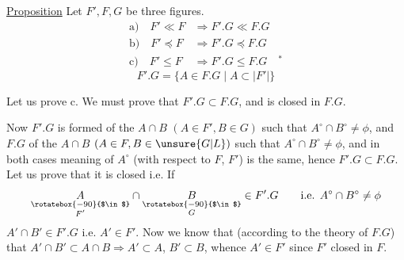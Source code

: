 \uline{Proposition} Let $F',F,G$ be three figures.
\[
\begin{aligned}
 \text{a)}\quad F'\ll F&\Longrightarrow F'.G\ll F.G\\
 \text{b)}\quad F'\preceq F&\Longrightarrow F'.G\preceq F.G\\
 \text{c)}\quad F'\leq F&\Longrightarrow F'.G\leq F.G\quad{}^{*}
\end{aligned}
\]
\[
 F'.G=\{A\in F.G\mid A\subset |F'|\}
\]

Let us prove c. We must prove that  $F'.G\subset F.G$, and is closed in $F.G$.

 Now $F'.G$ is formed of the $A\cap B$ $(A\in F',B\in G)$ such that $A^\circ\cap B^\circ\ne\phi$, and $F.G$ of the $A\cap B$ $(A\in F,B\in \unsure{G|L})$ such that $A^\circ\cap B^\circ\ne\phi$, and in both cases  meaning of $A^\circ$ (with respect to $F$,  $F'$) is the same, hence $F'.G\subset F.G$. Let us prove that it is closed i.e.
If 
\[
 \underset{\substack{\rotatebox{-90}{$\in$}\\ F'}}{A}\cap
 \underset{\substack{\rotatebox{-90}{$\in$}\\ G}}{B}\in F'.G\qquad
 \text{i.e. } A^\circ\cap B^\circ\ne\phi
\]
$A'\cap B'\in F'.G$ i.e. $A'\in F'$. Now we know that (according to the theory of $F.G$) that $A'\cap B'\subset A\cap B\Longrightarrow A'\subset A$, $B'\subset B$, whence $A'\in F'$ since $F'$ closed in $F$.

